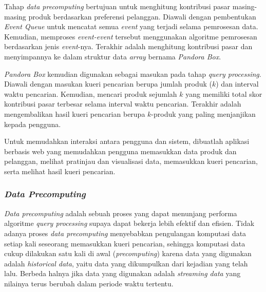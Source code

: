 Tahap \textit{data precomputing} bertujuan untuk menghitung kontribusi pasar masing-masing produk berdasarkan preferensi pelanggan. Diawali dengan pembentukan \textit{Event Queue} untuk mencatat semua \textit{event} yang terjadi selama pemrosesan data. Kemudian, memproses \textit{event-event} tersebut menggunakan algoritme pemrosesan berdasarkan jenis \textit{event}-nya. Terakhir adalah menghitung kontribusi pasar dan menyimpannya ke dalam struktur data \textit{array} bernama \textit{Pandora Box}.

\textit{Pandora Box} kemudian digunakan sebagai masukan pada tahap \textit{query processing}. Diawali dengan masukan kueri pencarian berupa jumlah produk ($k$) dan interval waktu pencarian. Kemudian, mencari produk sejumlah $k$ yang memiliki total skor kontribusi pasar terbesar selama interval waktu pencarian. Terakhir adalah mengembalikan hasil kueri pencarian berupa $k$-produk yang paling menjanjikan kepada pengguna.

Untuk memudahkan interaksi antara pengguna dan sistem, dibuatlah aplikasi berbasis web yang memudahkan pengguna memasukkan data produk dan pelanggan, melihat pratinjau dan visualisasi data, memasukkan kueri pencarian, serta melihat hasil kueri pencarian.   

\subsubsection{\textit{Data Precomputing}}
\tab \textit{Data precomputing} adalah sebuah proses yang dapat menunjang performa algoritme \textit{query processing} supaya dapat bekerja lebih efektif dan efisien. Tidak adanya proses \textit{data precomputing} menyebabkan pengulangan komputasi data setiap kali seseorang memasukkan kueri pencarian, sehingga komputasi data cukup dilakukan satu kali di awal (\textit{precomputing}) karena data yang digunakan adalah \textit{historical data}, yaitu data yang dikumpulkan dari kejadian yang telah lalu. Berbeda halnya jika data yang digunakan adalah \textit{streaming data} yang nilainya terus berubah dalam periode waktu tertentu.
	
